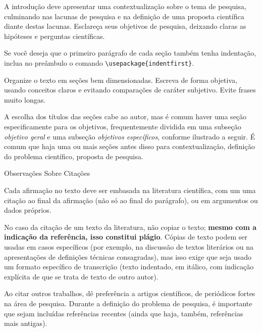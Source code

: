 \documentclass[a4paper, 12pt]{ppgeb}
\makeatletter
\renewcommand{\section}{\@startsection
{section}
{1}
{0mm}
{-\baselineskip}
{0.5\baselineskip}
{\large\bfseries\scshape}}
\makeatother
\begin{document}
A introdução deve apresentar uma contextualização sobre o tema de pesquisa, culminando nas lacunas de pesquisa e na definição de uma proposta científica diante destas lacunas. Esclareça seus objetivos de pesquisa, deixando claras as hipóteses e perguntas científicas.

Se você deseja que o primeiro parágrafo de cada seção também tenha indentação, inclua no preâmbulo o comando \verb,\usepackage{indentfirst},.

Organize o texto em seções bem dimensionadas. Escreva de forma objetiva, usando conceitos claros e evitando comparações de caráter subjetivo. Evite frases muito longas.

A escolha dos títulos das seções cabe ao autor, mas é comum haver uma seção especificamente para os objetivos, frequentemente dividida em uma subseção \emph{objetivo geral} e uma subseção \emph{objetivos específicos}, conforme ilustrado a seguir. É comum que haja uma ou mais seções antes disso para contextualização, definição do problema científico, proposta de pesquisa.

\section{Observações Sobre Citações}

Cada afirmação no texto deve ser embasada na literatura científica, com um uma citação ao final da afirmação (não só ao final do parágrafo), ou em argumentos ou dados próprios.

No caso da citação de um texto da literatura, não copiar o texto; \textbf{mesmo com a indicação da referência, isso constitui plágio}. Cópias de texto podem ser usadas em casos específicos (por exemplo, na discussão de textos literários ou na apresentações de definições técnicas consagradas), mas isso exige que seja usado um formato específico de transcrição (texto indentado, em itálico, com indicação explícita de que se trata de texto de outro autor).

Ao citar outros trabalhos, dê preferência a artigos científicos, de periódicos fortes na área de pesquisa. Durante a definição do problema de pesquisa, é importante que sejam incluídas referências recentes (ainda que haja, também, referências mais antigas).
\end{document}
